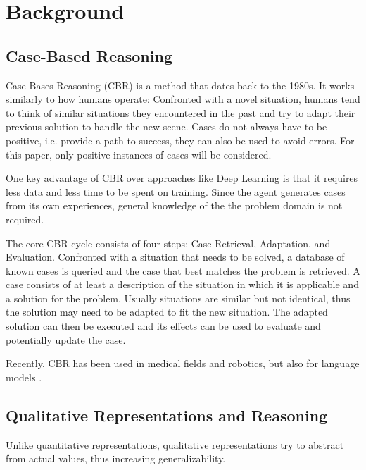 \section{Background}\label{sec:background}

\subsection{Case-Based Reasoning}
Case-Bases Reasoning (CBR) is a method that dates back to the 1980s. It works similarly to how humans operate: Confronted with a novel situation, humans tend to think of similar situations they encountered in the past and try to adapt their previous solution to handle the new scene. Cases do not always have to be positive, i.e. provide a path to success, they can also be used to avoid errors.\cite{Kolodner1992} For this paper, only positive instances of cases will be considered.

One key advantage of CBR over approaches like Deep Learning is that it requires less data and less time to be spent on training. Since the agent generates cases from its own experiences, general knowledge of the the problem domain is not required.\cite{CBR-issues-variations-approaches}

The core \ac{CBR} cycle consists of four steps: Case Retrieval, Adaptation, and Evaluation.\cite{Kolodner1992}
Confronted with a situation that needs to be solved, a database of known cases is queried and the case that best matches the problem is retrieved. A case consists of at least a description of the situation in which it is applicable and a solution for the problem. Usually situations are similar but not identical, thus the solution may need to be adapted to fit the new situation. The adapted solution can then be executed and its effects can be used to evaluate and potentially update the case.


Recently, CBR has been used in medical fields\cite{medical1, medical2} and robotics\cite{QCBR}, but also for language models \cite{text, text2}. %

\subsection{Qualitative Representations and Reasoning}
Unlike quantitative representations, qualitative representations try to abstract from actual values, thus increasing generalizability.




